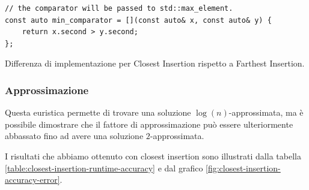 \begin{listing}[!ht]
\begin{verbatim}
// the comparator will be passed to std::max_element.
const auto min_comparator = [](const auto& x, const auto& y) {
    return x.second > y.second;
};
\end{verbatim}
\caption{Differenza di implementazione per Closest Insertion rispetto a Farthest Insertion.}
\label{listing:closest-insertion-diff}
\end{listing}

\subsubsection{Approssimazione}

Questa euristica permette di trovare una soluzione $\log(n)$-approssimata,
ma è possibile dimostrare che il fattore di approssimazione può essere
ulteriormente abbassato fino ad avere una soluzione $2$-approssimata.

I risultati che abbiamo ottenuto con closest insertion sono illustrati
dalla tabella \ref{table:closest-insertion-runtime-accuracy} e dal grafico
\ref{fig:closest-insertion-accuracy-error}.

